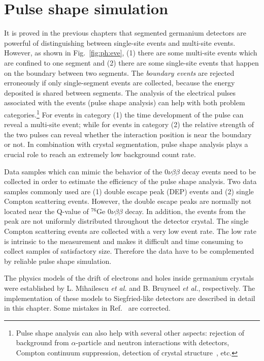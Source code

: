 \chapter{Pulse shape simulation}
\label{cha:pss}
It is proved in the previous chapters that segmented germanium detectors are powerful of distinguishing between single-site events and multi-site events. However, as shown in Fig.~\ref{fig:ph:eve}, (1) there are some multi-site events which are confined to one segment and (2) there are some single-site events that happen on the boundary between two segments. The \textit{boundary events} are rejected erroneously if only single-segment events are collected, because the energy deposited is shared between segments. The analysis of the electrical pulses associated with the events (pulse shape analysis) can help with both problem categories.\footnote{Pulse shape analysis can also help with several other aspects: rejection of background from $\alpha$-particle and neutron interactions with detectors, Compton continuum suppression\cite{comcon}, detection of crystal structure~\cite{agata}, etc.} For events in category (1) the time development of the pulse can reveal a multi-site event; while for events in category (2) the relative strength of the two pulses can reveal whether the interaction position is near the boundary or not. In combination with crystal segmentation, pulse shape analysis plays a crucial role to reach an extremely low background count rate.

Data samples which can mimic the behavior of the $0\nu\beta\beta$ decay events need to be collected in order to estimate the efficiency of the pulse shape analysis. Two data samples commonly used are (1) double escape peak (DEP) events and (2) single Compton scattering events\cite{scoms}. However, the double escape peaks are normally not located near the Q-value of $^{76}$Ge $0\nu\beta\beta$ decay. In addition, the events from the peak are not uniformly distributed throughout the detector crystal\cite{major}. The single Compton scattering events are collected with a very low event rate. The low rate is intrinsic to the measurement and makes it difficult and time consuming to collect samples of satisfactory size. Therefore the data have to be complemented by reliable pulse shape simulation.

The physics models of the drift of electrons and holes inside germanium crystals were established by L. Mihailescu \textit{et al.}\cite{miha} and B. Bruyneel \emph{et al.}\cite{bart}, respectively. The implementation of these models to Siegfried-like detectors are described in detail in this chapter. Some mistakes in Ref.~\cite{miha} are corrected.


